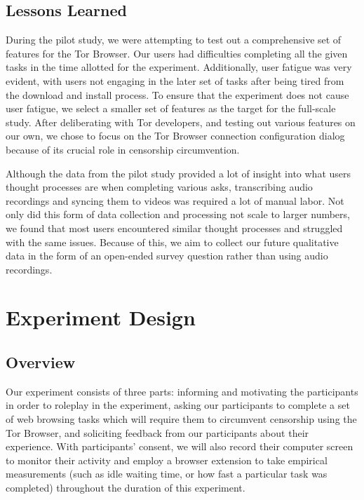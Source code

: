 \documentclass[letterpaper,twocolumn,11pt]{article}
\begin{document}
\subsection{Lessons Learned} 
\indent \indent During the pilot study, we were attempting to test out a comprehensive set of 
features for the Tor Browser. Our users had difficulties completing all the given tasks in the 
time allotted for the experiment. Additionally, user fatigue was very evident, with users not 
engaging in the later set of tasks after being tired from the download and install process. 
To ensure that the experiment does not cause user fatigue, we select a smaller set of features 
as the target for the full-scale study.  After deliberating with Tor developers, and testing out
various features on our own, we chose to focus on the Tor Browser connection configuration 
dialog because of its crucial role in censorship circumvention. 

Although the data from the pilot study provided a lot of insight into what users thought processes
are when completing various asks, transcribing audio recordings and syncing them to videos was
required a lot of manual labor. Not only did this form of data collection and processing not scale 
to larger numbers, we found that most users encountered similar thought processes and struggled
with the same issues. Because of this, we aim to collect our future qualitative data in the form of 
an open-ended survey question rather than using audio recordings. 

\section{Experiment Design}

\subsection{Overview} 
Our experiment consists of three parts: informing and motivating the participants in order 
to roleplay in the experiment, asking our participants to complete a set of web browsing tasks which will 
require them to circumvent censorship using the Tor Browser, and soliciting feedback from our participants
about their experience. With participants' consent, we will also record their computer screen to monitor 
their activity and employ a browser extension to take empirical measurements (such as idle waiting time, 
or how fast a particular task was completed) throughout the duration of this experiment. 
\end{document}

